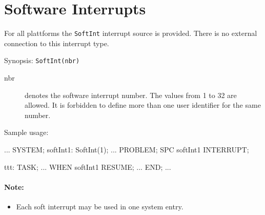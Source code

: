 \section{Software Interrupts}
For all plattforms the \verb|SoftInt| interrupt source is provided.
There is no external connection to this interrupt type.

Synopsis: \verb|SoftInt(nbr)|

\begin{description}
\item[nbr] denotes the software interrupt number. 
The values from 1 to 32 are allowed. It is forbidden to define more
than one user identifier for the same number.
\end{description}

Sample usage:

\begin{PEARLCode}
...
SYSTEM;
  softInt1: SoftInt(1);
...
PROBLEM;
   SPC softInt1 INTERRUPT;

ttt: TASK;
...
   WHEN softInt1 RESUME;
...
END;
...
\end{PEARLCode}

\paragraph{Note:}
\begin{itemize}
\item Each soft interrupt may be used in one system entry.
\end{itemize}

